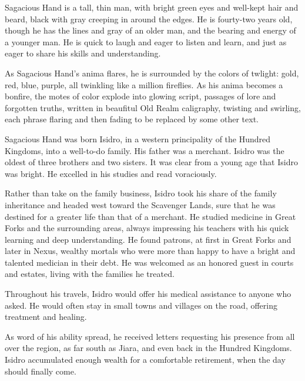 
Sagacious Hand is a tall, thin man, with bright green eyes and well-kept hair
and beard, black with gray creeping in around the edges. He is fourty-two years
old, though he has the lines and gray of an older man, and the bearing and
energy of a younger man. He is quick to laugh and eager to listen and learn,
and just as eager to share his skills and understanding.



As Sagacious Hand's anima flares, he is surrounded by the colors of twlight:
gold, red, blue, purple, all twinkling like a million fireflies. As his anima
becomes a bonfire, the motes of color explode into glowing script, passages of
lore and forgotten truths, written in beaufitul Old Realm caligraphy, twisting
and swirling, each phrase flaring and then fading to be replaced by some other
text.



Sagacious Hand was born Isidro, in a western principality of the Hundred
Kingdoms, into a well-to-do family. His father was a merchant. Isidro was the
oldest of three brothers and two sisters. It was clear from a young age that
Isidro was bright. He excelled in his studies and read voraciously.

Rather than take on the family business, Isidro took his share of the family
inheritance and headed west toward the Scavenger Lands, sure that he was
destined for a greater life than that of a merchant. He studied medicine in
Great Forks and the surrounding areas, always impressing his teachers with his
quick learning and deep understanding. He found patrons, at first in Great
Forks and later in Nexus, wealthy mortals who were more than happy to have a
bright and talented medician in their debt. He was welcomed as an honored guest
in courts and estates, living with the families he treated.

Throughout his travels, Isidro would offer his medical assistance to anyone who
asked. He would often stay in small towns and villages on the road, offering
treatment and healing.

As word of his ability spread, he received letters requesting his presence from
all over the region, as far south as Jiara, and even back in the Hundred
Kingdoms. Isidro accumulated enough wealth for a comfortable retirement, when
the day should finally come.



